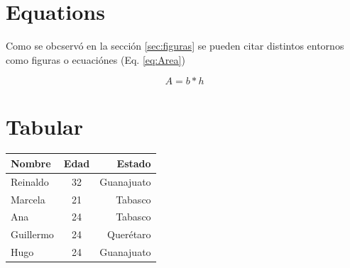 \documentclass[twocolumn]{article}
\begin{document}
\section{Equations} %
\label{sec:equatinons}
Como se obcserv\'o en la secci\'on \ref{sec:figuras} se pueden citar distintos entornos  como figuras o ecuaci\'ones (Eq. \eqref{eq:Area})

\begin{equation}\label{eq:Area}
A=b*h
\end{equation}


\section{Tabular} %
\label{sec:tabular}

\begin{center}
	
\begin{tabular}{|||l|c|r|||}
 \hline
 \hline
 \textbf{Nombre} & \textbf{Edad} & \textbf{Estado}\\
 \hline
 \hline
 \hline 
 Reinaldo	&	32	&	Guanajuato\\
 Marcela	&	21	&	Tabasco\\
 Ana 		&	24	&	Tabasco\\
 Guillermo	&	24	&	Quer\'etaro\\
 Hugo	&	24	&	Guanajuato\\
 \hline
 \hline
\end{tabular}

\end{center}
\end{document}
